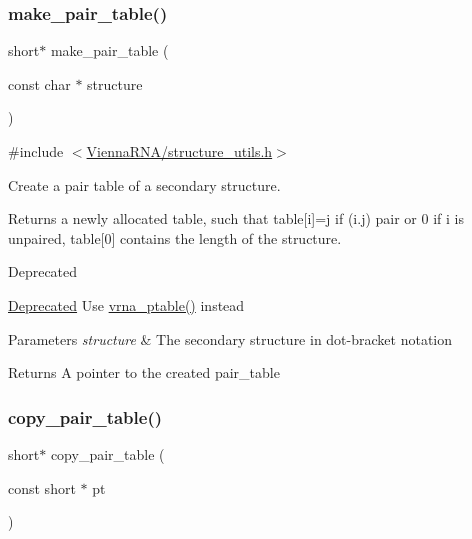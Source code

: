 \subsubsection{\texorpdfstring{make\+\_\+pair\+\_\+table()}{make\_pair\_table()}}
{\footnotesize\ttfamily short$\ast$ make\+\_\+pair\+\_\+table (\begin{DoxyParamCaption}\item[{const char $\ast$}]{structure }\end{DoxyParamCaption})}



{\ttfamily \#include $<$\hyperlink{structure__utils_8h}{Vienna\+R\+N\+A/structure\+\_\+utils.\+h}$>$}



Create a pair table of a secondary structure. 

Returns a newly allocated table, such that table\mbox{[}i\mbox{]}=j if (i.\+j) pair or 0 if i is unpaired, table\mbox{[}0\mbox{]} contains the length of the structure.

\begin{DoxyRefDesc}{Deprecated}
\item[\hyperlink{deprecated__deprecated000140}{Deprecated}]Use \hyperlink{group__struct__utils_gae829fb8bb7f694c12a9c0bbc34c77c60}{vrna\+\_\+ptable()} instead\end{DoxyRefDesc}



\begin{DoxyParams}{Parameters}
{\em structure} & The secondary structure in dot-\/bracket notation \\
\hline
\end{DoxyParams}
\begin{DoxyReturn}{Returns}
A pointer to the created pair\+\_\+table 
\end{DoxyReturn}
\mbox{\label{group__struct__utils_gafeaa6d68eef3a99d0a7aa08aa91c6601}} 
\subsubsection{\texorpdfstring{copy\+\_\+pair\+\_\+table()}{copy\_pair\_table()}}
{\footnotesize\ttfamily short$\ast$ copy\+\_\+pair\+\_\+table (\begin{DoxyParamCaption}\item[{const short $\ast$}]{pt }\end{DoxyParamCaption})}



